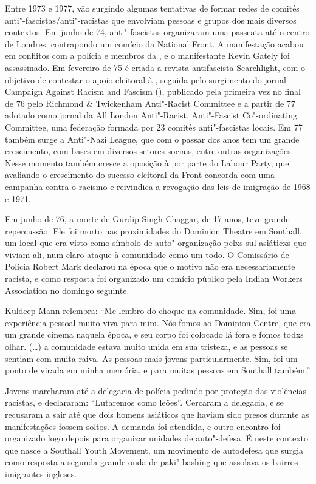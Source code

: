 Entre 1973 e 1977, vão surgindo algumas tentativas de formar redes de comitês anti"-fascistas/anti"-racistas que envolviam pessoas e grupos dos mais diversos contextos. Em junho de 74, anti"-fascistas organizaram uma passeata até o centro de Londres, contrapondo um comício da National Front. A manifestação acabou em conflitos com a polícia e membros da , e o manifestante Kevin Gately foi assassinado. Em fevereiro de 75 é criada a revista antifascista Searchlight, com o objetivo de contestar o apoio eleitoral à , seguida pelo surgimento do jornal Campaign Against Racism and Fascism (), publicado pela primeira vez no final de 76 pelo Richmond \& Twickenham Anti"-Racist Committee e a partir de 77 adotado como jornal da All London Anti"-Racist, Anti"-Fascist Co"-ordinating Committee, uma federação formada por 23 comitês anti"-fascistas locais. Em 77 também surge a Anti"-Nazi League, que com o passar dos anos tem um grande crescimento, com bases em diversos setores sociais, entre outras organizações. Nesse momento também cresce a oposição à  por parte do Labour Party, que avaliando o crescimento do sucesso eleitoral da Front concorda com uma campanha contra o racismo e reivindica a revogação das leis de imigração de 1968 e 1971.

Em junho de 76, a morte de Gurdip Singh Chaggar, de 17 anos, teve grande repercussão. Ele foi morto nas proximidades do Dominion Theatre em Southall, um local que era visto como símbolo de auto"-organização pelxs sul asiáticxs que viviam ali, num claro ataque à comunidade como um todo. O Comissário de Polícia Robert Mark declarou na época que o motivo não era necessariamente racista, e como resposta foi organizado um comício público pela Indian Workers Association no domingo seguinte.

Kuldeep Mann relembra: ``Me lembro do choque na comunidade. Sim, foi uma experiência pessoal muito viva para mim. Nós fomos ao Dominion Centre, que era um grande cinema naquela época, e seu corpo foi colocado lá fora e fomos todxs olhar. (\ldots{}) a comunidade estava muito unida em sua tristeza, e as pessoas se sentiam com muita raiva. As pessoas mais jovens particularmente. Sim, foi um ponto de virada em minha memória, e para muitas pessoas em Southall também.''

Jovens marcharam até a delegacia de polícia pedindo por proteção das violências racistas, e declararam: ``Lutaremos como leões''. Cercaram a delegacia, e se recusaram a sair até que dois homens asiáticos que haviam sido presos durante as manifestações fossem soltos. A demanda foi atendida, e outro encontro foi organizado logo depois para organizar unidades de auto"-defesa. É neste contexto que nasce a Southall Youth Movement, um movimento de autodefesa que surgia como resposta a segunda grande onda de paki"-bashing que assolava os bairros imigrantes ingleses.

